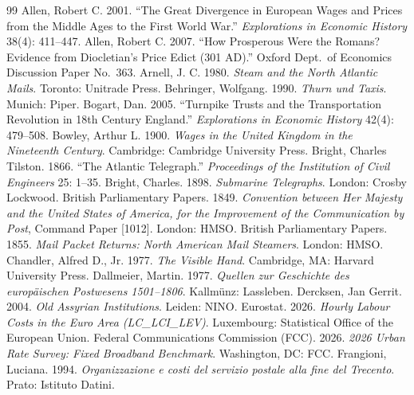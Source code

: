 \documentclass[11pt,a4paper]{article}
\begin{document}
\begin{thebibliography}{99}
 Allen, Robert C. 2001. ``The Great Divergence in European Wages and Prices from the Middle Ages to the First World War.'' \textit{Explorations in Economic History} 38(4): 411--447.
 Allen, Robert C. 2007. ``How Prosperous Were the Romans? Evidence from Diocletian's Price Edict (301 AD).'' Oxford Dept.\ of Economics Discussion Paper No.\ 363.
 Arnell, J. C. 1980. \textit{Steam and the North Atlantic Mails}. Toronto: Unitrade Press.
 Behringer, Wolfgang. 1990. \textit{Thurn und Taxis}. Munich: Piper.
 Bogart, Dan. 2005. ``Turnpike Trusts and the Transportation Revolution in 18th Century England.'' \textit{Explorations in Economic History} 42(4): 479--508.
 Bowley, Arthur L. 1900. \textit{Wages in the United Kingdom in the Nineteenth Century}. Cambridge: Cambridge University Press.
 Bright, Charles Tilston. 1866. ``The Atlantic Telegraph.'' \textit{Proceedings of the Institution of Civil Engineers} 25: 1--35.
 Bright, Charles. 1898. \textit{Submarine Telegraphs}. London: Crosby Lockwood.
 British Parliamentary Papers. 1849. \textit{Convention between Her Majesty and the United States of America, for the Improvement of the Communication by Post}, Command Paper [1012]. London: HMSO.
 British Parliamentary Papers. 1855. \textit{Mail Packet Returns: North American Mail Steamers}. London: HMSO.
 Chandler, Alfred D., Jr. 1977. \textit{The Visible Hand}. Cambridge, MA: Harvard University Press.
 Dallmeier, Martin. 1977. \textit{Quellen zur Geschichte des europ\"aischen Postwesens 1501--1806}. Kallm\"unz: Lassleben.
 Dercksen, Jan Gerrit. 2004. \textit{Old Assyrian Institutions}. Leiden: NINO.
 Eurostat. 2026. \textit{Hourly Labour Costs in the Euro Area (LC\_LCI\_LEV)}. Luxembourg: Statistical Office of the European Union.
 Federal Communications Commission (FCC). 2026. \textit{2026 Urban Rate Survey: Fixed Broadband Benchmark}. Washington, DC: FCC.
 Frangioni, Luciana. 1994. \textit{Organizzazione e costi del servizio postale alla fine del Trecento}. Prato: Istituto Datini.

\end{thebibliography}
\end{document}
